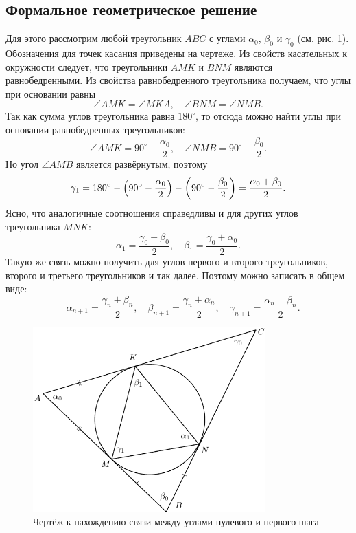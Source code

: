 \documentclass[12pt]{article}
\begin{document}
\subsection{Формальное геометрическое решение}
 Для этого рассмотрим любой треугольник $ABC$ с углами $\alpha_0$, $\beta_0$ и $\gamma_0$ (см. рис. \ref{fig:7}). Обозначения для точек касания приведены на чертеже. Из свойств касательных к окружности следует, что треугольники $AMK$ и $BNM$ являются равнобедренными. Из свойства равнобедренного треугольника получаем, что углы при основании равны
\begin{equation}
	\angle AMK = \angle MKA, \quad \angle BNM = \angle NMB.
\end{equation}
Так как сумма углов треугольника равна $180^{\circ}$, то отсюда можно найти углы при основании равнобедренных треугольников:
\begin{equation}
	\angle AMK = 90^{\circ} - \dfrac{\alpha_0}{2}, \quad \angle NMB = 90^{\circ} - \dfrac{\beta_0}{2}.
\end{equation}
Но угол $\angle AMB$ является развёрнутым, поэтому
\begin{equation}\label{eq:25}
	\gamma_1 = 180^{\circ} - \qty(90^{\circ} - \dfrac{\alpha_0}{2}) - \qty(90^{\circ} - \dfrac{\beta_0}{2}) = \dfrac{\alpha_0 + \beta_0}{2}.
\end{equation}
Ясно, что аналогичные соотношения справедливы и для других углов треугольника $MNK$:
\begin{equation}\label{eq:26}
	\alpha_1 = \dfrac{\gamma_0 + \beta_0}{2}, \quad \beta_1 = \dfrac{\gamma_0 + \alpha_0}{2}.
\end{equation}
Такую же связь можно получить для углов первого и второго треугольников, второго и третьего треугольников и так далее. Поэтому можно записать в общем виде:
\begin{equation}
	\quad \alpha_{n+1} = \dfrac{\gamma_n + \beta_n}{2}, \quad \beta_{n+1} = \dfrac{\gamma_n + \alpha_n}{2}, \quad \gamma_{n+1} = \dfrac{\alpha_n + \beta_n}{2}.
\end{equation}
\begin{figure}[!ht]
	\centering
	\includegraphics[width=0.8\textwidth]{first6.pdf}
	\caption{Чертёж к нахождению связи между углами нулевого и первого шага}
	\label{fig:7}
\end{figure}
\end{document}

